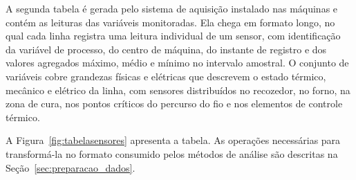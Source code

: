 A segunda tabela é gerada pelo sistema de aquisição instalado nas máquinas e contém as leituras das variáveis monitoradas. Ela chega em formato longo, no qual cada linha registra uma leitura individual de um sensor, com identificação da variável de processo, do centro de máquina, do instante de registro e dos valores agregados máximo, médio e mínimo no intervalo amostral. O conjunto de variáveis cobre grandezas físicas e elétricas que descrevem o estado térmico, mecânico e elétrico da linha, com sensores distribuídos no recozedor, no forno, na zona de cura, nos pontos críticos do percurso do fio e nos elementos de controle térmico.

A Figura~\ref{fig:tabelasensores} apresenta a tabela. As operações necessárias para transformá-la no formato consumido pelos métodos de análise são descritas na Seção~\ref{sec:preparacao_dados}.
